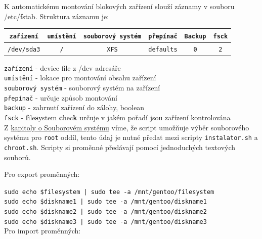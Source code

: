 \documentclass[12pt,a4paper,twoside,]{article}
\begin{document}
{{{{{{K automatickému montování blokových zařízení slouží záznamy v souboru /etc/fstab. Struktura záznamu je:

\begin{table}[h]
	\begin{tabular}{|c|c|c|c|c|c|}
		\hline
		\texttt{zařízení} & \texttt{umístění} & \texttt{souborový systém} & \texttt{přepínač} & \texttt{Backup} & \texttt{fsck} \\
		\hline
		\texttt{/dev/sda3} & \texttt{/} & \texttt{XFS} & \texttt{defaults} & \texttt{0} & \texttt{2} \\
		\hline
		
	\end{tabular}
\end{table}
\hspace*{-1.5em}\texttt{zařízení} - device file z /dev adresáře\\
\texttt{umístění} - lokace pro montování obsahu zařízení \\
\texttt{souborový systém} - souborový systém na zařízení\\
\texttt{přepínač} - určuje způsob montování\\
\texttt{backup} - zahrnutí zařízení do zálohy, boolean\\
\texttt{fsck} - {\bf f}ile{\bf s}ystem {\bf c}hec{\bf k} určuje v jakém pořadí jsou zařízení kontrolována\\

Z \hyperlink{Souborový systém}{kapitoly o Souborovém systému} víme, že script umožňuje výběr souborového systému pro \texttt{root} oddíl, tento údaj je nutné předat mezi scripty \texttt{instalator.sh} a \texttt{chroot.sh}. Scripty si proměnné předávají pomocí jednoduchých textových souborů.

\hspace*{-1.5em}Pro export proměnných:

\texttt{sudo echo \$filesystem | sudo tee -a /mnt/gentoo/filesystem} \\
\hspace*{1.5em}\texttt{sudo echo \$diskname1 | sudo tee -a /mnt/gentoo/diskname1} \\
\hspace*{1.5em}\texttt{sudo echo \$diskname2 | sudo tee -a /mnt/gentoo/diskname2} \\
\hspace*{1.5em}\texttt{sudo echo \$diskname3 | sudo tee -a /mnt/gentoo/diskname3} \\

\hspace*{-1.5em}Pro import proměnných:

}}}}}}
\end{document}
